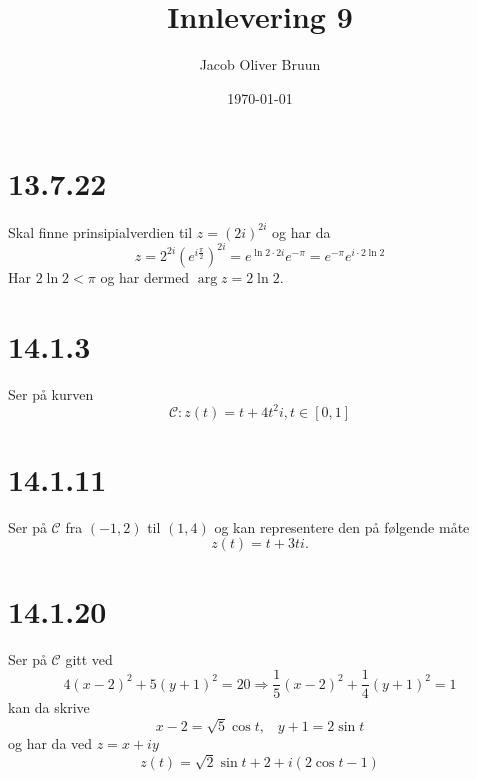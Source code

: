 \documentclass{report}
\title{Innlevering 9}
\author{Jacob Oliver Bruun}
\date{\today}
\newcommand{\nbrack}[1]{\left( #1 \right)}
\newcommand{\bbrack}[1]{\left[ #1 \right]}
\begin{document}
\section*{13.7.22}
Skal finne prinsipialverdien til $z=(2i)^{2i}$ og har da
\begin{equation}
  \label{eq:1}
  z = 2^{2i} \nbrack{ e^{i\frac{\pi}{2}} }^{2i} = e^{\ln 2 \cdot 2i} e^{-\pi} = e^{-\pi}e^{i\cdot 2\ln 2}
\end{equation}
Har $2\ln 2 < \pi$ og har dermed $\arg z = 2\ln 2$.


\section*{14.1.3}
Ser på kurven
\begin{equation}
  \label{eq:2}
  \mathcal{C} : z(t) = t + 4t^{2}i, t \in \bbrack{ 0, 1 }
\end{equation}


\section*{14.1.11}
Ser på $\mathcal{C}$ fra $(-1,2)$ til $(1,4)$ og kan representere den på følgende måte
\begin{equation}
  \label{eq:3}
  z(t) = t + 3ti.
\end{equation}



\section*{14.1.20}
Ser på $\mathcal{C}$ gitt ved
\begin{equation}
  \label{eq:4}
  4(x-2)^{2} + 5(y+1)^{2} = 20 \Rightarrow \frac{1}{5}(x-2)^{2} + \frac{1}{4}(y+1)^{2} = 1
\end{equation}
kan da skrive
\begin{equation}
  \label{eq:5}
  x-2 = \sqrt{5} \cos t, \;\;\; y+1 = 2 \sin t
\end{equation}
og har da ved $z = x + iy$
\begin{equation}
  \label{eq:6}
  z(t) = \sqrt{2} \sin t + 2 + i\nbrack{ 2\cos t - 1 }
\end{equation}
\end{document}
